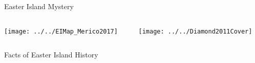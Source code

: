 

\begin{frame}{Easter Island Mystery}
	\centering
	\begin{columns}
		\begin{column}{0.7\textwidth}
				\texttt{[image: ../../EIMap\_Merico2017]}
		\end{column}
	\pause\begin{column}{0.3\textwidth}
	\centering
	\texttt{[image: ../../Diamond2011Cover]}
	\end{column}
	\end{columns}
\end{frame}

\begin{frame}{Facts of Easter Island History}
\centering
\begin{figure}
	\centering
	\begin{subfigure}{0.15\textwidth}
	\centering
	\end{subfigure}\hfill
	\begin{subfigure}{0.15\textwidth}
	\centering
	\end{subfigure}\hfill

\end{figure}
\end{frame}
